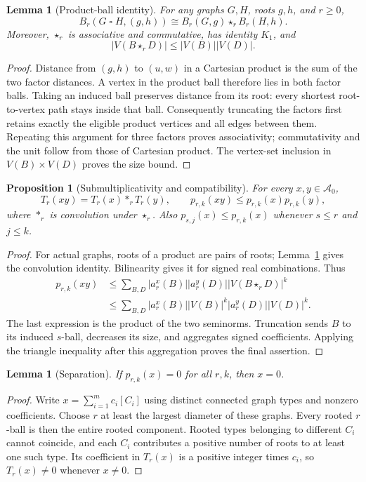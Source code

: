 \documentclass[11pt]{article}
\newtheorem{lemma}[theorem]{Lemma}
\newtheorem{proposition}[theorem]{Proposition}
\theoremstyle{definition}\newtheorem{definition}[theorem]{Definition}
\newcommand{\A}{\mathcal A}
\newcommand{\sq}{\mathbin{\square}}
\newcommand{\abs}[1]{\left|#1\right|}
\begin{document}
\begin{lemma}[Product-ball identity]\label{lem:ball}
For any graphs $G,H$, roots $g,h$, and $r\ge0$,
\[
 B_r(G\sq H,(g,h))\cong B_r(G,g)\star_r B_r(H,h).
\]
Moreover, $\star_r$ is associative and commutative, has identity $K_1$, and
\[
 \abs{V(B\star_r D)}\le \abs{V(B)}\abs{V(D)}.
\]
\end{lemma}
\begin{proof}
Distance from $(g,h)$ to $(u,w)$ in a Cartesian product is the sum of the two factor distances. A vertex in the product ball therefore lies in both factor balls. Taking an induced ball preserves distance from its root: every shortest root-to-vertex path stays inside that ball. Consequently truncating the factors first retains exactly the eligible product vertices and all edges between them. Repeating this argument for three factors proves associativity; commutativity and the unit follow from those of Cartesian product. The vertex-set inclusion in $V(B)\times V(D)$ proves the size bound.
\end{proof}

\begin{proposition}[Submultiplicativity and compatibility]\label{prop:sub}
For every $x,y\in\A_0$,
\[
 T_r(xy)=T_r(x)*_rT_r(y),\qquad
 p_{r,k}(xy)\le p_{r,k}(x)p_{r,k}(y),
\]
where $*_r$ is convolution under $\star_r$. Also
$p_{s,j}(x)\le p_{r,k}(x)$ whenever $s\le r$ and $j\le k$.
\end{proposition}
\begin{proof}
For actual graphs, roots of a product are pairs of roots; Lemma~\ref{lem:ball} gives the convolution identity. Bilinearity gives it for signed real combinations. Thus
\begin{align*}
 p_{r,k}(xy)
 &\le \sum_{B,D}\abs{a_r^x(B)}\abs{a_r^y(D)}
          \abs{V(B\star_rD)}^k\\
 &\le \sum_{B,D}\abs{a_r^x(B)}\abs{V(B)}^k
                    \abs{a_r^y(D)}\abs{V(D)}^k.
\end{align*}
The last expression is the product of the two seminorms. Truncation sends $B$ to its induced $s$-ball, decreases its size, and aggregates signed coefficients. Applying the triangle inequality after this aggregation proves the final assertion.
\end{proof}

\begin{lemma}[Separation]\label{lem:sep}
If $p_{r,k}(x)=0$ for all $r,k$, then $x=0$.
\end{lemma}
\begin{proof}
Write $x=\sum_{i=1}^m c_i[C_i]$ using distinct connected graph types and nonzero coefficients. Choose $r$ at least the largest diameter of these graphs. Every rooted $r$-ball is then the entire rooted component. Rooted types belonging to different $C_i$ cannot coincide, and each $C_i$ contributes a positive number of roots to at least one such type. Its coefficient in $T_r(x)$ is a positive integer times $c_i$, so $T_r(x)\ne0$ whenever $x\ne0$.
\end{proof}
\end{document}

